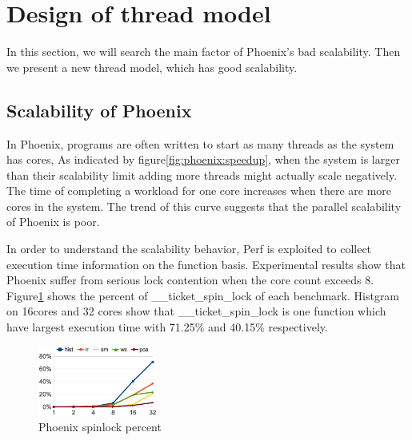 \section{Design of thread model}
{\color{red}In this section, we will search the main factor of Phoenix's bad scalability.
Then we present a new thread model, which has good scalability.
}



\subsection{Scalability of Phoenix}
In Phoenix, programs are often written to start as many threads as the system has cores,
As indicated by figure\ref{fig:phoenix:speedup}, 
when the system is larger than their scalability limit 
adding more threads might actually scale negatively.
The time of completing a workload for one core increases 
when there are more cores in the system. 
The trend of this curve suggests that
the parallel scalability of Phoenix is poor.

In order to understand the scalability behavior, 
Perf\cite{} is exploited to collect execution time information
on the function basis. 
Experimental results show that Phoenix suffer from serious lock contention
when the core count exceeds 8.
Figure\ref{fig:phoenix:spinlock} shows the percent of \_\_ticket\_spin\_lock of each benchmark.
Histgram on 16cores and 32 cores
show that \_\_ticket\_spin\_lock is one function 
which have largest execution time with 71.25\% and 40.15\% respectively. 
\begin{figure}[!h!t]  
    \centering
    \includegraphics[width=0.35\textwidth]{eps/phoenix_spinlock.eps}
    \caption{Phoenix spinlock percent}
    \label{fig:phoenix:spinlock}
\end{figure}


